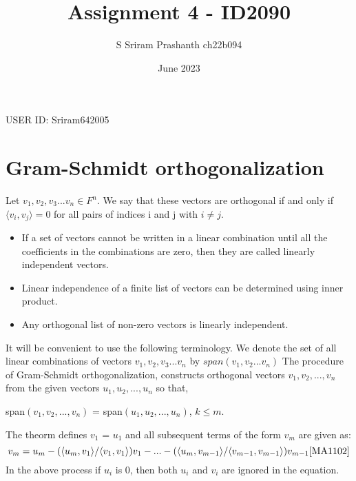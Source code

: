 \documentclass{article}
\title{Assignment 4 - ID2090}
\author{S Sriram Prashanth ch22b094}
\date{June 2023}
\begin{document}
\maketitle
\begin{center}
    USER ID: Sriram642005
\end{center}

\clearpage
\section{Gram-Schmidt orthogonalization}
Let $v_1,v_2,v_3...v_n \in F^n$. We say that these vectors are orthogonal if and only if $\langle v_i, v_j \rangle = 0$ for all pairs of indices i and j with $ i \neq j$.
\begin{itemize}
    \item If a set of vectors cannot be written in a linear combination until all the coefficients in the combinations are zero, then they are called linearly independent vectors.
    \item Linear independence of a finite list of vectors can be determined using inner product.
    \item Any orthogonal list of non-zero vectors is linearly independent.
\end{itemize}
It will be convenient to use the following terminology. We denote the set of all
linear combinations of vectors $v_1,v_2,v_3...v_n$ by $span(v_1,v_2...v_n)$ 
The procedure of Gram-Schmidt orthogonalization, constructs orthogonal vectors $v_1,v_2,...,v_n$ from the given vectors $u_1,u_2,...,u_n$ so that,
\begin{center}
    span$(v_1,v_2,...,v_n)$ = span$(u_1,u_2,...,u_n)$, $k \leq m$.
\end{center}
The theorm defines $v_1$ = $u_1$ and all subsequent terms of the form $v_m$ are given as:
\begin{equation}
    v_m = u_m - ( \langle u_m,v_1 \rangle / \langle v_1,v_1 \rangle ) v_1 - ... - ( \langle u_m,v_{m-1} \rangle / \langle v_{m-1},v_{m-1} \rangle ) v_{m-1} \cite{MA1102}
\end{equation}
In the above process if $u_i$ is 0, then both $u_i$ and $v_i$ are ignored in the equation.


\end{document}
